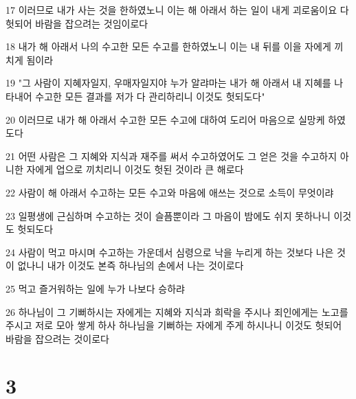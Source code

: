 \par 17 이러므로 내가 사는 것을 한하였노니 이는 해 아래서 하는 일이 내게 괴로움이요 다 헛되어 바람을 잡으려는 것임이로다
\par 18 내가 해 아래서 나의 수고한 모든 수고를 한하였노니 이는 내 뒤를 이을 자에게 끼치게 됨이라
\par 19 "그 사람이 지혜자일지, 우매자일지야 누가 알랴마는 내가 해 아래서 내 지혜를 나타내어 수고한 모든 결과를 저가 다 관리하리니 이것도 헛되도다"
\par 20 이러므로 내가 해 아래서 수고한 모든 수고에 대하여 도리어 마음으로 실망케 하였도다
\par 21 어떤 사람은 그 지혜와 지식과 재주를 써서 수고하였어도 그 얻은 것을 수고하지 아니한 자에게 업으로 끼치리니 이것도 헛된 것이라 큰 해로다
\par 22 사람이 해 아래서 수고하는 모든 수고와 마음에 애쓰는 것으로 소득이 무엇이랴
\par 23 일평생에 근심하며 수고하는 것이 슬픔뿐이라 그 마음이 밤에도 쉬지 못하나니 이것도 헛되도다
\par 24 사람이 먹고 마시며 수고하는 가운데서 심령으로 낙을 누리게 하는 것보다 나은 것이 없나니 내가 이것도 본즉 하나님의 손에서 나는 것이로다
\par 25 먹고 즐거워하는 일에 누가 나보다 승하랴
\par 26 하나님이 그 기뻐하시는 자에게는 지혜와 지식과 희락을 주시나 죄인에게는 노고를 주시고 저로 모아 쌓게 하사 하나님을 기뻐하는 자에게 주게 하시나니 이것도 헛되어 바람을 잡으려는 것이로다

\chapter{3}

